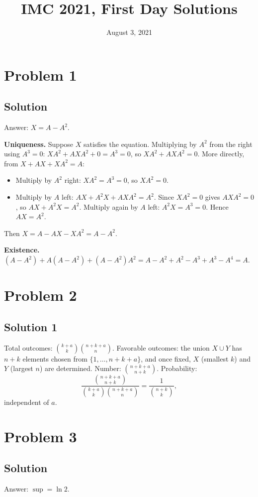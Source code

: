 \documentclass{article}
\title{IMC 2021, First Day Solutions}
\date{August 3, 2021}
\begin{document}
\maketitle

\section*{Problem 1}
\subsection*{Solution}
Answer: $X = A - A^2$.

\textbf{Uniqueness.} Suppose $X$ satisfies the equation. Multiplying by $A^2$ from the right using $A^3 = 0$: $XA^2 + AXA^2 + 0 = A^3 = 0$, so $XA^2 + AXA^2 = 0$. More directly, from $X + AX + XA^2 = A$:
\begin{itemize}
\item Multiply by $A^2$ right: $XA^2 = A^3 = 0$, so $XA^2 = 0$.
\item Multiply by $A$ left: $AX + A^2 X + AXA^2 = A^2$. Since $XA^2 = 0$ gives $AXA^2 = 0$, so $AX + A^2X = A^2$. Multiply again by $A$ left: $A^2 X = A^3 = 0$. Hence $AX = A^2$.
\end{itemize}
Then $X = A - AX - XA^2 = A - A^2$.

\textbf{Existence.} $(A - A^2) + A(A - A^2) + (A - A^2)A^2 = A - A^2 + A^2 - A^3 + A^3 - A^4 = A$.

\section*{Problem 2}
\subsection*{Solution 1}
Total outcomes: $\binom{k+a}{k}\binom{n+k+a}{n}$. Favorable outcomes: the union $X \cup Y$ has $n+k$ elements chosen from $\{1,\ldots,n+k+a\}$, and once fixed, $X$ (smallest $k$) and $Y$ (largest $n$) are determined. Number: $\binom{n+k+a}{n+k}$. Probability:
\[ \frac{\binom{n+k+a}{n+k}}{\binom{k+a}{k}\binom{n+k+a}{n}} = \frac{1}{\binom{n+k}{k}}, \]
independent of $a$.

\section*{Problem 3}
\subsection*{Solution}
Answer: $\sup = \ln 2$.
\end{document}
